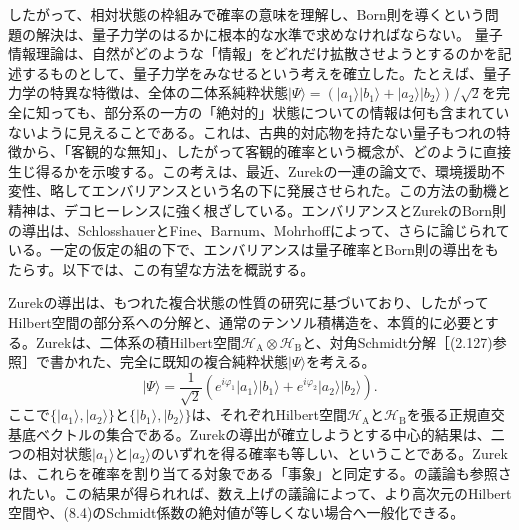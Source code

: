 したがって、相対状態の枠組みで確率の意味を理解し、Born則を導くという問題の解決は、量子力学のはるかに根本的な水準で求めなければならない。
\hypertarget{srcpage:341}{}\label{srcpage:341}
量子情報理論は、自然がどのような「情報」をどれだけ拡散させようとするのかを記述するものとして、量子力学をみなせるという考えを確立した\cite{ref056}。たとえば、量子力学の特異な特徴は、全体の二体系純粋状態$|\Psi\rangle=(|a_1\rangle|b_1\rangle+|a_2\rangle|b_2\rangle)/\sqrt2$を完全に知っても、部分系の一方の「絶対的」状態についての情報は何も含まれていないように見えることである。これは、古典的対応物を持たない量子もつれの特徴から、「客観的な無知」、したがって客観的確率という概念が、どのように直接生じ得るかを示唆する。この考えは、最近、Zurekの一連の論文\cite{ref016,ref065,ref066,ref067}で、環境援助不変性、略してエンバリアンスという名の下に発展させられた。この方法の動機と精神は、デコヒーレンスに強く根ざしている。エンバリアンスとZurekのBorn則の導出は、SchlosshauerとFine\cite{ref424}、Barnum\cite{ref425}、Mohrhoff\cite{ref426}によって、さらに論じられている。一定の仮定の組の下で、エンバリアンスは量子確率とBorn則の導出をもたらす。以下では、この有望な方法を概説する。

Zurekの導出は、もつれた複合状態の性質の研究に基づいており、したがってHilbert空間の部分系への分解と、通常のテンソル積構造を、本質的に必要とする。Zurekは、二体系の積Hilbert空間$\mathcal H_{\mathrm A}\otimes\mathcal H_{\mathrm B}$と、対角Schmidt分解［(2.127)参照］で書かれた、完全に既知の複合純粋状態$|\Psi\rangle$を考える。
\begin{equation}
|\Psi\rangle=\frac1{\sqrt2}\left(e^{i\varphi_1}|a_1\rangle|b_1\rangle+e^{i\varphi_2}|a_2\rangle|b_2\rangle\right).\tag{8.4}
\end{equation}
ここで$\{|a_1\rangle,|a_2\rangle\}$と$\{|b_1\rangle,|b_2\rangle\}$は、それぞれHilbert空間$\mathcal H_{\mathrm A}$と$\mathcal H_{\mathrm B}$を張る正規直交基底ベクトルの集合である。Zurekの導出が確立しようとする中心的結果は、二つの相対状態$|a_1\rangle$と$|a_2\rangle$のいずれを得る確率も等しい、ということである。Zurekは、これらを確率を割り当てる対象である「事象」と同定する\cite[12頁]{ref066}。\cite{ref424}の議論も参照されたい。この結果が得られれば、数え上げの議論によって、より高次元のHilbert空間や、(8.4)のSchmidt係数の絶対値が等しくない場合へ一般化できる\cite{ref067}。

